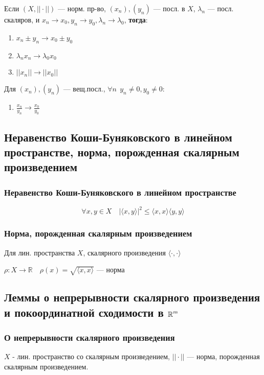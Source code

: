 Если $(X, ||\cdot||)$ --- норм. пр-во, $(x_n),(y_n)$ --- посл. в $X$, $\lambda_n$ ---
посл. скаляров, и $x_n\to x_0, y_n\to y_0, \lambda_n\to \lambda_0$, \textbf{тогда}:
\begin{enumerate}
\item $x_n\pm y_n\to x_0\pm y_0$
\item $\lambda_nx_n\to \lambda_0 x_0$
\item $||x_n||\to||x_0||$
\end{enumerate}

Для $(x_n),(y_n)$ 
--- вещ.посл., $\forall n \ \ y_n\not =0, y_0\not = 0$:
\begin{enumerate}[resume]
\item $\frac{x_n}{y_n}\to\frac{x_0}{y_0}$
\end{enumerate}

\subsection{Неравенство Коши-Буняковского в линейном пространстве, норма, порожденная скалярным произведением}

\subsubsection{Неравенство Коши-Буняковского в линейном пространстве}
$$\forall x,y\in X\quad |\langle x,y\rangle|^2\leq \langle x,x\rangle \langle y,y\rangle$$

\subsubsection{Норма, порожденная скалярным произведением}
Для лин. пространства $X$, скалярного произведения $\langle \cdot ,\cdot \rangle$

$\rho:X\to\mathbb{R} \quad \rho(x)=\sqrt{\langle x,x\rangle}$ --- норма

\subsection{Леммы о непрерывности скалярного произведения и покоординатной сходимости в $\operatorname*{\mathbb{R}}^m$}

\subsubsection{О непрерывности скалярного произведения}

$X$ - лин. пространство со скалярным произведением, $||\cdot||$ --- норма, порожденная скалярным произведением.

